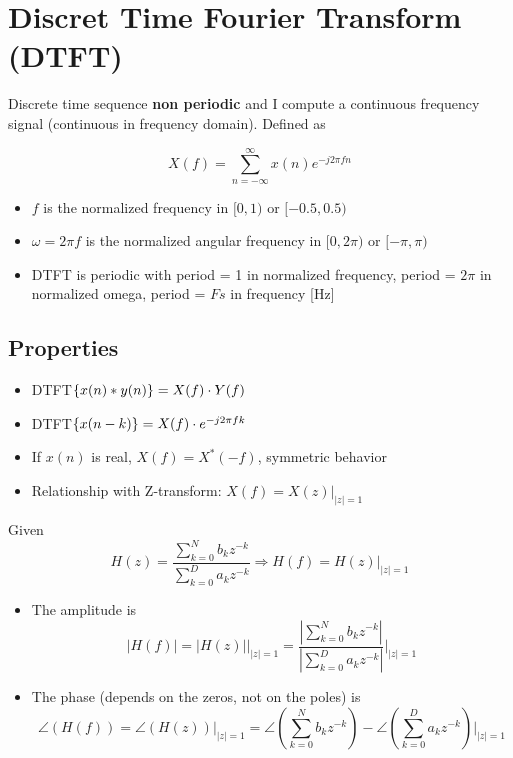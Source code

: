 
\section{Discret Time Fourier Transform (DTFT)}
Discrete time sequence \textbf{non periodic} and I compute a continuous frequency signal (continuous in frequency domain). Defined as
\begin{LARGE}
    $$
    X(f)=\sum_{n=-\infty}^\infty x(n)e^{-j2\pi fn}
    $$
\end{LARGE}
\begin{itemize}
    \item $f$ is the normalized frequency in $[0,1)$ or $[-0.5,0.5)$
    \item $\omega=2\pi f$ is the normalized angular frequency in $[0,2\pi)$ or $[-\pi,\pi)$
    \item DTFT is periodic with period = 1 in normalized frequency, period = $2\pi$ in normalized omega, period = $Fs$ in frequency [Hz]
\end{itemize}

\subsection{Properties}
\begin{itemize}
    \item DTFT$\{{x(n)*y(n)}\}=X(f)\cdot Y(f)$
    \item DTFT$\{{x(n-k)}\}=X(f)\cdot e^{-j2\pi fk}$
    \item If $x(n)$ is real, $X(f)=X^*(-f)$, symmetric behavior
    \item Relationship with Z-transform: $X(f)=X(z)\Big|_{|z|=1}$
\end{itemize}
Given
$$
H(z)=\frac{
    \sum_{k=0}^Nb_kz^{-k}
}{
    \sum_{k=0}^Da_kz^{-k}
}\Rightarrow H(f)=H(z)\Big|_{|z|=1}
$$
\begin{itemize}
    \item The amplitude is
    $$
    |H(f)|=|H(z)|\Big|_{|z|=1}=\frac{
        \left|\sum_{k=0}^Nb_kz^{-k}\right|
    }{
        \left|\sum_{k=0}^Da_kz^{-k}\right|
    }\Bigg|_{|z|=1}
    $$
    \item The phase (depends on the zeros, not on the poles) is
    $$
    \angle(H(f))=\angle(H(z))\Big|_{|z|=1}=\angle\left(
        \sum_{k=0}^Nb_kz^{-k}
    \right)-\angle\left(
        \sum_{k=0}^Da_kz^{-k}
    \right)\Bigg|_{|z|=1}
    $$
\end{itemize}